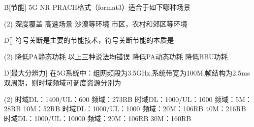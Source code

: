 

\begin{choice}{B}[节能]
    5G NR PRACH格式（format3）适合于如下哪种场景
    \begin{tasks}(2)
        \task 深度覆盖
        \task 高速场景
        \task 沙漠等环境
        \task 市区，农村和郊区等环境
    \end{tasks}
\end{choice}

\begin{choice}{D}[]
    符号关断是主要的节能技术，符号关断节能的本质是
    \begin{tasks}(2)
        \task 降低PA静态功耗
        \task 以上三种说法均错误
        \task 降低PA动态功耗
        \task 降低BBU功耗
    \end{tasks}
\end{choice}




\begin{choice}{D}[最大分辨力]
    在5G系统中：组网频段为3.5GHz,系统带宽为100M,帧结构为2.5ms双周期，则时域频域可调度资源分别为
    \begin{tasks}(2)
        \task 时域DL：1400/UL：600 频域：273RB
        \task 时域DL：1000/UL：1000 频域：5M：28RB 10M：52RB
        \task 时域DL：1000/UL：1000 频域：20M：106RB 40M：216RB
        \task 时域DL：1000/UL：10000 频域：20M：106RB 30M：160RB
    \end{tasks}
\end{choice}


